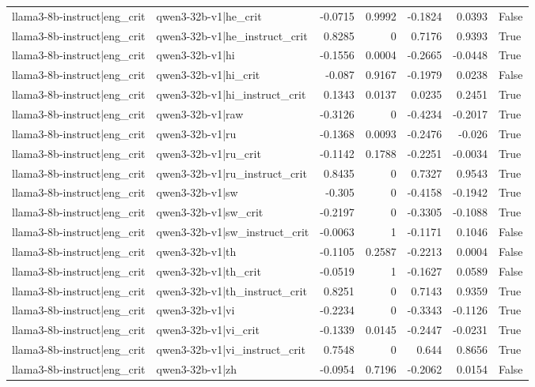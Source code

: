 \begin{table}
\begin{tabular}{l l r r r r l}
llama3-8b-instruct|eng_crit & qwen3-32b-v1|he_crit & -0.0715 & 0.9992 & -0.1824 & 0.0393 & False \\
llama3-8b-instruct|eng_crit & qwen3-32b-v1|he_instruct_crit & 0.8285 & 0 & 0.7176 & 0.9393 & True \\
llama3-8b-instruct|eng_crit & qwen3-32b-v1|hi & -0.1556 & 0.0004 & -0.2665 & -0.0448 & True \\
llama3-8b-instruct|eng_crit & qwen3-32b-v1|hi_crit & -0.087 & 0.9167 & -0.1979 & 0.0238 & False \\
llama3-8b-instruct|eng_crit & qwen3-32b-v1|hi_instruct_crit & 0.1343 & 0.0137 & 0.0235 & 0.2451 & True \\
llama3-8b-instruct|eng_crit & qwen3-32b-v1|raw & -0.3126 & 0 & -0.4234 & -0.2017 & True \\
llama3-8b-instruct|eng_crit & qwen3-32b-v1|ru & -0.1368 & 0.0093 & -0.2476 & -0.026 & True \\
llama3-8b-instruct|eng_crit & qwen3-32b-v1|ru_crit & -0.1142 & 0.1788 & -0.2251 & -0.0034 & True \\
llama3-8b-instruct|eng_crit & qwen3-32b-v1|ru_instruct_crit & 0.8435 & 0 & 0.7327 & 0.9543 & True \\
llama3-8b-instruct|eng_crit & qwen3-32b-v1|sw & -0.305 & 0 & -0.4158 & -0.1942 & True \\
llama3-8b-instruct|eng_crit & qwen3-32b-v1|sw_crit & -0.2197 & 0 & -0.3305 & -0.1088 & True \\
llama3-8b-instruct|eng_crit & qwen3-32b-v1|sw_instruct_crit & -0.0063 & 1 & -0.1171 & 0.1046 & False \\
llama3-8b-instruct|eng_crit & qwen3-32b-v1|th & -0.1105 & 0.2587 & -0.2213 & 0.0004 & False \\
llama3-8b-instruct|eng_crit & qwen3-32b-v1|th_crit & -0.0519 & 1 & -0.1627 & 0.0589 & False \\
llama3-8b-instruct|eng_crit & qwen3-32b-v1|th_instruct_crit & 0.8251 & 0 & 0.7143 & 0.9359 & True \\
llama3-8b-instruct|eng_crit & qwen3-32b-v1|vi & -0.2234 & 0 & -0.3343 & -0.1126 & True \\
llama3-8b-instruct|eng_crit & qwen3-32b-v1|vi_crit & -0.1339 & 0.0145 & -0.2447 & -0.0231 & True \\
llama3-8b-instruct|eng_crit & qwen3-32b-v1|vi_instruct_crit & 0.7548 & 0 & 0.644 & 0.8656 & True \\
llama3-8b-instruct|eng_crit & qwen3-32b-v1|zh & -0.0954 & 0.7196 & -0.2062 & 0.0154 & False \\

\end{tabular}
\end{table}

